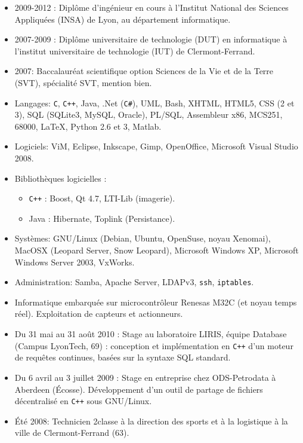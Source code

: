 \begin{itemize}
    \item 2009-2012 : Diplôme d'ingénieur en cours à l'Institut National des Sciences Appliquées (INSA) de Lyon, au département informatique.
    \item 2007-2009 : Diplôme universitaire de technologie (DUT) en informatique à l'institut universitaire de technologie (IUT) de Clermont-Ferrand.
    \item 2007: Baccalauréat scientifique option Sciences de la Vie et de la
    Terre (SVT), spécialité SVT, mention bien.
\end{itemize}
\begin{itemize}
    \item Langages: {\tt C}, {\tt C++}, Java, .Net ({\tt C\#}), UML, Bash,
    XHTML, HTML5, CSS (2 et 3), SQL (SQLite3, MySQL, Oracle), PL/SQL, Assembleur
    x86, MCS251, 68000, \LaTeX{}, Python 2.6 et 3, Matlab.
    \item Logiciels: ViM, Eclipse, Inkscape, Gimp, OpenOffice, Microsoft Visual Studio 2008.
    \item Bibliothèques logicielles :
    \begin{itemize}
	\item {\tt C++} : Boost, Qt 4.7, LTI-Lib (imagerie).
	\item Java : Hibernate, Toplink (Persistance).
    \end{itemize}
    \item Systèmes: GNU/Linux (Debian, Ubuntu, OpenSuse, noyau Xenomai), MacOSX
    (Leopard Server, Snow Leopard), Microsoft Windows XP, Microsoft Windows Server 2003, VxWorks.
	\item Administration: Samba, Apache Server, LDAPv3, {\tt ssh}, {\tt iptables}.
	\item Informatique embarquée sur microcontrôleur Renesas M32C (et noyau temps réel). Exploitation de capteurs et actionneurs.
\end{itemize}
\begin{itemize}
       \item Du 31 mai au 31 août 2010 : Stage au laboratoire LIRIS, équipe
       Database (Campus LyonTech, 69) : conception et implémentation en
				      \texttt{C++} d'un moteur de requêtes
				      continues, basées sur la syntaxe SQL
				      standard.
       \item Du 6 avril au 3 juillet 2009 : Stage en entreprise chez
       ODS-Petrodata à Aberdeen (Écosse). Développement d'un outil de partage de
       fichiers décentralisé en {\tt C++} sous GNU/Linux.
       \item Été 2008: Technicien 2\ieme classe à la direction des sports et à la logistique à la ville de Clermont-Ferrand (63).
\end{itemize}
